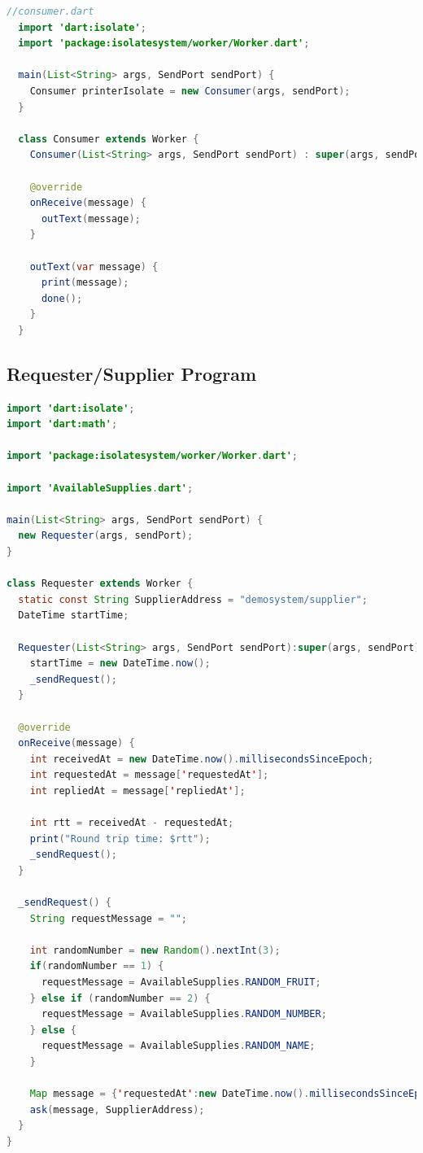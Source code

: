 \begin{lstlisting}[language=java, firstnumber=1, caption=Basic version of Consumer Worker of Producer-Consumer application, label=lst:consumer]
  //consumer.dart
  import 'dart:isolate';
  import 'package:isolatesystem/worker/Worker.dart';

  main(List<String> args, SendPort sendPort) {
    Consumer printerIsolate = new Consumer(args, sendPort);
  }

  class Consumer extends Worker {
    Consumer(List<String> args, SendPort sendPort) : super(args, sendPort);

    @override
    onReceive(message) {
      outText(message);
    }

    outText(var message) {
      print(message);
      done();
    }
  }

\end{lstlisting}

\subsection{Requester/Supplier Program}
\label{sec:request-reply-program}


\begin{lstlisting}[language=java, firstnumber=1, caption=Requester Worker of Requester-Supplier application, label=lst:consumer]
import 'dart:isolate';
import 'dart:math';

import 'package:isolatesystem/worker/Worker.dart';

import 'AvailableSupplies.dart';

main(List<String> args, SendPort sendPort) {
  new Requester(args, sendPort);
}

class Requester extends Worker {
  static const String SupplierAddress = "demosystem/supplier";
  DateTime startTime;

  Requester(List<String> args, SendPort sendPort):super(args, sendPort) {
    startTime = new DateTime.now();
    _sendRequest();
  }

  @override
  onReceive(message) {
    int receivedAt = new DateTime.now().millisecondsSinceEpoch;
    int requestedAt = message['requestedAt'];
    int repliedAt = message['repliedAt'];

    int rtt = receivedAt - requestedAt;
    print("Round trip time: $rtt");
    _sendRequest();
  }

  _sendRequest() {
    String requestMessage = "";

    int randomNumber = new Random().nextInt(3);
    if(randomNumber == 1) {
      requestMessage = AvailableSupplies.RANDOM_FRUIT;
    } else if (randomNumber == 2) {
      requestMessage = AvailableSupplies.RANDOM_NUMBER;
    } else {
      requestMessage = AvailableSupplies.RANDOM_NAME;
    }

    Map message = {'requestedAt':new DateTime.now().millisecondsSinceEpoch, 'requestMessage':requestMessage};
    ask(message, SupplierAddress);
  }
}

\end{lstlisting}

